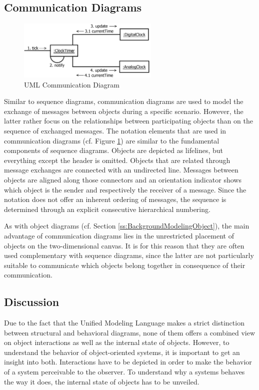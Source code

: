 \subsection{Communication Diagrams}
\label{ss:BackgroundModelingCommunication}

\begin{figure}
	\centering
	\includegraphics[width=0.6\textwidth]{../images/02-Communication}
	\caption[TOC Caption]{UML Communication Diagram}
	\label{fig:ModelingCommunication}
\end{figure}

Similar to sequence diagrams, communication diagrams \cite{rumbaugh_unified_2010} are used to model the exchange of messages between objects during a specific scenario.
However, the latter rather focus on the relationships between participating objects than on the sequence of exchanged messages.
The notation elements that are used in communication diagrams (cf. Figure \ref{fig:ModelingCommunication}) are similar to the fundamental components of sequence diagrams.
Objects are depicted as lifelines, but everything except the header is omitted.
Objects that are related through message exchanges are connected with an undirected line.
Messages between objects are aligned along those connectors and an orientation indicator shows which object is the sender and respectively the receiver of a message.
Since the notation does not offer an inherent ordering of messages, the sequence is determined through an explicit consecutive hierarchical numbering.

As with object diagrams (cf. Section \ref{ss:BackgroundModelingObject}), the main advantage of communication diagrams lies in the unrestricted placement of objects on the two-dimensional canvas.
It is for this reason that they are often used complementary with sequence diagrams, since the latter are not particularly suitable to communicate which objects belong together in consequence of their communication.

\subsection{Discussion}
Due to the fact that the Unified Modeling Language makes a strict distinction between structural and behavioral diagrams, none of them offers a combined view on object interactions as well as the internal state of objects.
However, to understand the behavior of object-oriented systems, it is important to get an insight into both.
Interactions have to be depicted in order to make the behavior of a system perceivable to the observer.
To understand why a systems behaves the way it does, the internal state of objects has to be unveiled.

